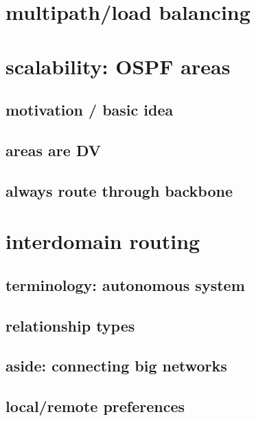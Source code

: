 \section{multipath/load balancing}


\section{scalability: OSPF areas} %

\subsection{motivation / basic idea}



\subsection{areas are DV}



\subsection{always route through backbone}


\section{interdomain routing}


\subsection{terminology: autonomous system}


\subsection{relationship types}


\subsection{aside: connecting big networks}


\subsection{local/remote preferences}


